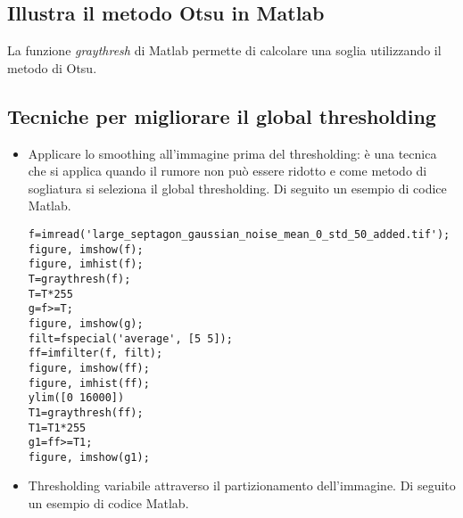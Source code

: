 \subsection{Illustra il metodo Otsu in Matlab} 
La funzione \textit{graythresh} di Matlab permette di calcolare una soglia utilizzando il metodo di Otsu.

\subsection{Tecniche per migliorare il global thresholding}
\begin{itemize}
\item Applicare lo smoothing all'immagine prima del thresholding: è una tecnica che si applica quando il rumore non può essere ridotto e come metodo di sogliatura si seleziona il global thresholding. Di seguito un esempio di codice Matlab.

\begin{lstlisting}
f=imread('large_septagon_gaussian_noise_mean_0_std_50_added.tif');
figure, imshow(f);
figure, imhist(f);
T=graythresh(f);
T=T*255
g=f>=T;
figure, imshow(g);
filt=fspecial('average', [5 5]);
ff=imfilter(f, filt);
figure, imshow(ff);
figure, imhist(ff);
ylim([0 16000])
T1=graythresh(ff);
T1=T1*255
g1=ff>=T1;
figure, imshow(g1);
\end{lstlisting}

\item Thresholding variabile attraverso il partizionamento dell'immagine. Di seguito un esempio di codice Matlab.

\begin{lstlisting}


\end{lstlisting}

\end{itemize}
